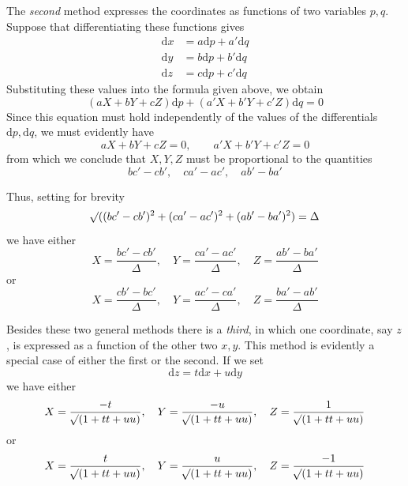 \par\indent{}%
The \textit{second} method expresses the coordinates as functions of two variables \(p,q\). Suppose that differentiating these functions gives
\[
\begin{aligned}
\mathrm{d}x&=a\mathrm{d}p+a'\mathrm{d}q\\
\mathrm{d}y&=b\mathrm{d}p+b'\mathrm{d}q\\
\mathrm{d}z&=c\mathrm{d}p+c'\mathrm{d}q
\end{aligned}
\]
\noindent Substituting these values into the formula given above, we obtain
\[
(aX+bY+cZ)\mathrm{d}p+(a'X+b'Y+c'Z)\mathrm{d}q=0
\]
\noindent Since this equation must hold independently of the values of the differentials \(\mathrm{d}p,\mathrm{d}q\), we must evidently have
\[
aX+bY+cZ=0,\qquad a'X+b'Y+c'Z=0
\]
\noindent from which we conclude that \(X,Y,Z\) must be proportional to the quantities
\[
bc'-cb',\quad ca'-ac',\quad ab'-ba'
\]
\par\indent Thus, setting for brevity
\[
\mathord{{}^{}\!\surd}((bc'-cb')^2+(ca'-ac')^2+(ab'-ba')^2)=\Delta
\]
\noindent we have either
\[
X=\frac{bc'-cb'}{\Delta},\quad Y=\frac{ca'-ac'}{\Delta},\quad Z=\frac{ab'-ba'}{\Delta}
\]
\noindent or
\[
X=\frac{cb'-bc'}{\Delta},\quad Y=\frac{ac'-ca'}{\Delta},\quad Z=\frac{ba'-ab'}{\Delta}
\]
\par\indent Besides these two general methods there is a \textit{third}, in which one coordinate, say \(z\), is expressed as a function of the other two \(x,y\). This method is evidently a special case of either the first or the second. If we set
\[
\mathrm{d}z=t\mathrm{d}x+u\mathrm{d}y
\]
\noindent we have either
\[
X=\frac{-t}{\mathord{{}^{}\!\surd}(1+tt+uu)},\quad Y=\frac{-u}{\mathord{{}^{}\!\surd}(1+tt+uu)},\quad Z=\frac{1}{\mathord{{}^{}\!\surd}(1+tt+uu)}
\]
\noindent or
\[
X=\frac{t}{\mathord{{}^{}\!\surd}(1+tt+uu)},\quad Y=\frac{u}{\mathord{{}^{}\!\surd}(1+tt+uu)},\quad Z=\frac{-1}{\mathord{{}^{}\!\surd}(1+tt+uu)}
\]
